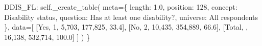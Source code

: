 \documentclass[
  11pt,
  a4paper,
]{article}
\newenvironment{Shaded}{\begin{snugshade}}{\end{snugshade}}
\newcommand{\NormalTok}[1]{\textcolor[rgb]{0.00,0.23,0.31}{#1}}
\newcommand{\OperatorTok}[1]{\textcolor[rgb]{0.37,0.37,0.37}{#1}}
\newcommand{\StringTok}[1]{\textcolor[rgb]{0.13,0.47,0.30}{#1}}
\newcommand{\VariableTok}[1]{\textcolor[rgb]{0.07,0.07,0.07}{#1}}
\begin{document}
\begin{Shaded}
\begin{Highlighting}[]
            \StringTok{\textquotesingle{}DDIS\_FL\textquotesingle{}}\NormalTok{: }\VariableTok{self}\NormalTok{.\_create\_table(}
\NormalTok{                meta}\OperatorTok{=}\NormalTok{\{}
                    \StringTok{\textquotesingle{}length\textquotesingle{}}\NormalTok{: }\StringTok{\textquotesingle{}1.0\textquotesingle{}}\NormalTok{, }\StringTok{\textquotesingle{}position\textquotesingle{}}\NormalTok{: }\StringTok{\textquotesingle{}128\textquotesingle{}}\NormalTok{,}
                    \StringTok{\textquotesingle{}concept\textquotesingle{}}\NormalTok{: }\StringTok{\textquotesingle{}Disability status\textquotesingle{}}\NormalTok{,}
                    \StringTok{\textquotesingle{}question\textquotesingle{}}\NormalTok{: }\StringTok{\textquotesingle{}Has at least one disability?\textquotesingle{}}\NormalTok{,}
                    \StringTok{\textquotesingle{}universe\textquotesingle{}}\NormalTok{: }\StringTok{\textquotesingle{}All respondents\textquotesingle{}}
\NormalTok{                \},}
\NormalTok{                data}\OperatorTok{=}\NormalTok{[}
\NormalTok{                    [}\StringTok{\textquotesingle{}Yes\textquotesingle{}}\NormalTok{, }\StringTok{\textquotesingle{}1\textquotesingle{}}\NormalTok{, }\StringTok{\textquotesingle{}5,703\textquotesingle{}}\NormalTok{, }\StringTok{\textquotesingle{}177,825\textquotesingle{}}\NormalTok{, }\StringTok{\textquotesingle{}33.4\textquotesingle{}}\NormalTok{],}
\NormalTok{                    [}\StringTok{\textquotesingle{}No\textquotesingle{}}\NormalTok{, }\StringTok{\textquotesingle{}2\textquotesingle{}}\NormalTok{, }\StringTok{\textquotesingle{}10,435\textquotesingle{}}\NormalTok{, }\StringTok{\textquotesingle{}354,889\textquotesingle{}}\NormalTok{, }\StringTok{\textquotesingle{}66.6\textquotesingle{}}\NormalTok{],}
\NormalTok{                    [}\StringTok{\textquotesingle{}Total\textquotesingle{}}\NormalTok{, }\StringTok{\textquotesingle{}\textquotesingle{}}\NormalTok{, }\StringTok{\textquotesingle{}16,138\textquotesingle{}}\NormalTok{, }\StringTok{\textquotesingle{}532,714\textquotesingle{}}\NormalTok{, }\StringTok{\textquotesingle{}100.0\textquotesingle{}}\NormalTok{]}
\NormalTok{                ]}
\NormalTok{            )}
\NormalTok{        \}}
    

\end{Highlighting}
\end{Shaded}
\end{document}
